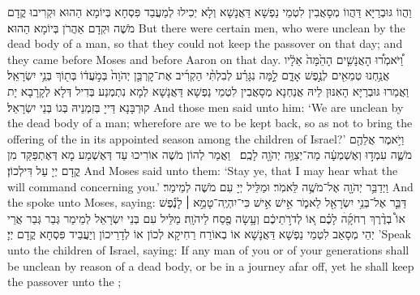{וַהֲווֹ גּוּבְרַיָּא דַּהֲווֹ מְסָאֲבִין לִטְמֵי נַפְשָׁא דַּאֲנָשָׁא וְלָא יְכִילוּ לְמַעֲבַד פִּסְחָא בְּיוֹמָא הַהוּא וּקְרִיבוּ קֳדָם מֹשֶׁה וּקְדָם אַהֲרֹן בְּיוֹמָא הַהוּא׃}
{But there were certain men, who were unclean by the dead body of a man, so that they could not keep the passover on that day; and they came before Moses and before Aaron on that day.}{}
{וַ֠יֹּאמְר֠וּ הָאֲנָשִׁ֤ים הָהֵ֙מָּה֙ אֵלָ֔יו אֲנַ֥חְנוּ טְמֵאִ֖ים לְנֶ֣פֶשׁ אָדָ֑ם לָ֣מָּה נִגָּרַ֗ע לְבִלְתִּ֨י הַקְרִ֜יב אֶת־קׇרְבַּ֤ן יְהֹוָה֙ בְּמֹ֣עֲד֔וֹ בְּת֖וֹךְ בְּנֵ֥י יִשְׂרָאֵֽל׃
}
{וַאֲמַרוּ גּוּבְרַיָּא הָאִנּוּן לֵיהּ אֲנַחְנָא מְסָאֲבִין לִטְמֵי נַפְשָׁא דַּאֲנָשָׁא לְמָא נִתְמְנַע בְּדִיל דְּלָא לְקָרָבָא יָת קוּרְבָּנָא דַּייָ בְּזִמְנֵיהּ בְּגוֹ בְּנֵי יִשְׂרָאֵל׃}
{And those men said unto him: ‘We are unclean by the dead body of a man; wherefore are we to be kept back, so as not to bring the offering of the \lord\space in its appointed season among the children of Israel?’}{}
{וַיֹּ֥אמֶר אֲלֵהֶ֖ם מֹשֶׁ֑ה עִמְד֣וּ וְאֶשְׁמְעָ֔ה מַה־יְצַוֶּ֥ה יְהֹוָ֖ה לָכֶֽם׃ \petucha }
{וַאֲמַר לְהוֹן מֹשֶׁה אוֹרִיכוּ עַד דְּאֶשְׁמַע מָא דְּאֶתְפַּקַּד מִן קֳדָם יְיָ עַל דִּילְכוֹן׃}
{And Moses said unto them: ‘Stay ye, that I may hear what the \lord\space will command concerning you.’}{}
{וַיְדַבֵּ֥ר יְהֹוָ֖ה אֶל־מֹשֶׁ֥ה לֵּאמֹֽר׃}
{וּמַלֵּיל יְיָ עִם מֹשֶׁה לְמֵימַר׃}
{And the \lord\space spoke unto Moses, saying:}{}
{דַּבֵּ֛ר אֶל־בְּנֵ֥י יִשְׂרָאֵ֖ל לֵאמֹ֑ר אִ֣ישׁ אִ֣ישׁ כִּי־יִהְיֶֽה־טָמֵ֣א \small ׀\normalsize  לָנֶ֡פֶשׁ אוֹ֩ בְדֶ֨רֶךְ רְחֹקָ֜הׄ לָכֶ֗ם א֚וֹ לְדֹרֹ֣תֵיכֶ֔ם וְעָ֥שָׂה פֶ֖סַח לַיהֹוָֽה׃
}
{מַלֵּיל עִם בְּנֵי יִשְׂרָאֵל לְמֵימַר גְּבַר גְּבַר אֲרֵי יְהֵי מְסָאַב לִטְמֵי נַפְשָׁא דַּאֲנָשָׁא אוֹ בְאוֹרַח רַחִיקָא לְכוֹן אוֹ לְדָרֵיכוֹן וְיַעֲבֵיד פִּסְחָא קֳדָם יְיָ׃}
{’Speak unto the children of Israel, saying: If any man of you or of your generations shall be unclean by reason of a dead body, or be in a journey afar off, yet he shall keep the passover unto the \lord;}{}
